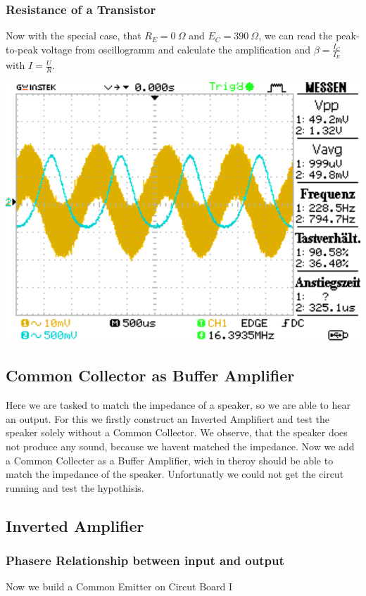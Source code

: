 \documentclass[a4paper,10pt]{article}
\newenvironment{Figure}
  {\par\medskip\noindent\minipage{\linewidth}}
  {\endminipage\par\medskip} %
\numberwithin{equation}{section}
\begin{document}
\begin{multicols}{2}
  \subsubsection{Resistance of a Transistor}
  Now with the special case, that $R_E=\SI{0}{\Omega}$ and $E_C=\SI{390}{\Omega}$, we can read the peak-to-peak voltage from oscillogramm and calculate the amplification and $\beta=\frac{I_C}{I_E}$ with $I=\frac{U}{R}$.

	\begin{Figure}
		\centering
		\includegraphics[width=1\textwidth]{../data/DS0022.png}
		\label{fig:rn}
	\end{Figure}
        \subsection{Common Collector as Buffer Amplifier}
        Here we are tasked to match the impedance of a speaker, so we are able to hear an output. For this we firstly construct an Inverted Amplifiert and test the speaker solely without a Common Collector. We observe, that the speaker does not produce any sound, because we havent matched the impedance. Now we add a Common Collecter as a Buffer Amplifier, wich in theroy should be able to match the impedance of the speaker. Unfortunatly we could not get the circut running and test the hypothisis. 
        \subsection{Inverted Amplifier}
        \subsubsection{Phasere Relationship between input and output}
        Now we build a Common Emitter on Circut Board I 


\end{multicols}
\end{document}
